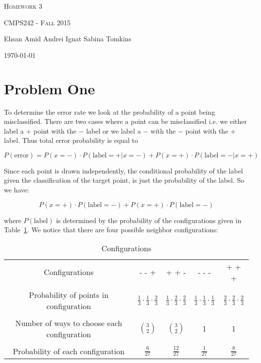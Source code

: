 \documentclass{article}
\begin{document}
\begin{center}
\Huge{\textsc{Homework 3}} 

\Large\textsc{CMPS242 - Fall 2015}

\large{    \hfill Ehsan Amid \hfill Andrei Ignat \hfill Sabina Tomkins}

\normalsize\flushright\today
\end{center}
\vfill

\section{Problem One}
To determine the error rate we look at the probability of a point being misclassified. There are two cases where a point can be misclassified i.e. we either label a $+$ point with the $-$ label or we label a $-$ with the $-$ point with the $+$ label. Thus total error probability is equal to 

\[
P(\text{error})=P(x=-)\cdot P(\text{label} = +| x = -) + P(x=+)\cdot P(\text{label} = -| x=+)
\]

Since each point is drawn independently, the conditional probability of the label given the classification of the target point, is just the probability of the label. So we have:

\[
P(x=+)\cdot P(\text{label} = -) + P(x=+)\cdot P(\text{label} =-)
\]

where $P(\text{label})$ is determined by the probability of the configurations given in Table~\ref{tab:p1confs}. We notice that there are four possible neighbor configurations:\\

\begin{table}[ht]
\centering
\caption{Configurations}\label{tab:p1confs}
\begin{tabular}{|c|c|c|c|c|}\hline
Configurations&- - +  &  + + - & - - - & + + + \\
& & & & \\
Probability of points in configuration &$\frac{1}{3}\cdot \frac{1}{3}\cdot \frac{2}{3}$ &$\frac{1}{3}\cdot \frac{2}{3}\cdot \frac{2}{3}$  & $\frac{1}{3}\cdot \frac{1}{3}\cdot \frac{1}{3}$ &$\frac{2}{3}\cdot \frac{2}{3}\cdot \frac{2}{3}$ \\
& & & & \\
Number of ways to choose each configuration & $\binom{3}{2}$& $\binom{3}{2}$ & 1 & 1 \\
& & & & \\
Probability of each configuration & $\frac{6}{27}$ & $\frac{12}{27}$& $\frac{1}{27}$& $\frac{8}{27}$\\
\hline
\end{tabular}
\end{table}
\end{document}
